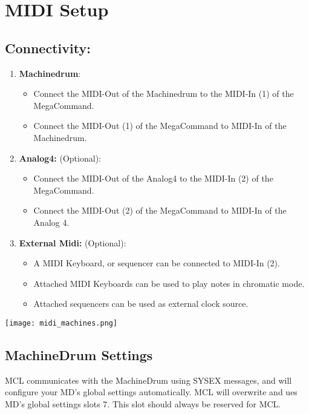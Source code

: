 \chapter{MIDI Setup}
\section{Connectivity:}

\begin{enumerate}
\item\textbf{Machinedrum}:
\begin{itemize}
    \item Connect the MIDI-Out of the Machinedrum to the MIDI-In (1) of the MegaCommand.
    \item Connect the MIDI-Out (1) of the MegaCommand to MIDI-In of the Machinedrum.
\end{itemize}

\item\textbf{Analog4:} (Optional):
\begin{itemize}
    \item Connect the MIDI-Out of the Analog4 to the MIDI-In (2) of the MegaCommand. 
    \item Connect the MIDI-Out (2) of the MegaCommand to MIDI-In of the Analog 4.
\end{itemize}

\item\textbf{External Midi:} (Optional): 
\begin{itemize}
    \item A MIDI Keyboard, or sequencer can be connected to MIDI-In (2). 
    \item Attached MIDI Keyboards can be used to play notes in chromatic mode.
    \item Attached sequencers can be used as external clock source.
\end{itemize}

\end{enumerate}
\texttt{[image: midi\_machines.png]}
\\
\newpage
\section{MachineDrum Settings }

MCL communicates with the MachineDrum using SYSEX messages, and will configure your MD's global settings automatically. MCL will overwrite and ues MD's global settings slots 7. This slot should always be reserved for MCL.

